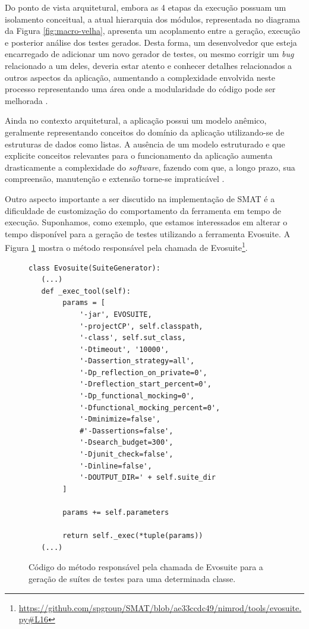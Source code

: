 \documentclass[12pt]{article}
\begin{document}
Do ponto de vista arquitetural, embora as 4 etapas da execução possuam um isolamento conceitual, a atual hierarquia dos módulos, representada no diagrama da Figura \ref{fig:macro-velha}, apresenta um acoplamento entre a geração, execução e posterior análise dos testes gerados. Desta forma, um desenvolvedor que esteja encarregado de adicionar um novo gerador de testes, ou mesmo corrigir um \textit{bug} relacionado a um deles, deveria estar atento e conhecer detalhes relacionados a outros aspectos da aplicação, aumentando a complexidade envolvida neste processo representando uma área onde a modularidade do código pode ser melhorada \cite{ousterhout2018philosophy}.

Ainda no contexto arquitetural, a aplicação possui um modelo anêmico, geralmente representando conceitos do domínio da aplicação utilizando-se de estruturas de dados como listas. A ausência de um modelo estruturado e que explicite conceitos relevantes para o funcionamento da aplicação aumenta drasticamente a complexidade do \textit{software}, fazendo com que, a longo prazo, sua compreensão, manutenção e extensão torne-se impraticável \cite{ddd}.

Outro aspecto importante a ser discutido na implementação de SMAT é a dificuldade de customização do comportamento da ferramenta em tempo de execução. Suponhamos, como exemplo, que estamos interessados em alterar o tempo disponível para a geração de testes utilizando a ferramenta Evosuite. A Figura \ref{fig:evosuite} mostra o método responsável pela chamada de Evosuite\footnote{\href{https://github.com/spgroup/SMAT/blob/ae33ccdc49/nimrod/tools/evosuite.py\#L16}{https://github.com/spgroup/SMAT/blob/ae33ccdc49/nimrod/tools/evosuite.py\#L16}}.

\begin{figure}[H]
    \begin{verbatim}
class Evosuite(SuiteGenerator):
   (...)
   def _exec_tool(self):
        params = [
            '-jar', EVOSUITE,
            '-projectCP', self.classpath,
            '-class', self.sut_class,
            '-Dtimeout', '10000',
            '-Dassertion_strategy=all',
            '-Dp_reflection_on_private=0',
            '-Dreflection_start_percent=0',
            '-Dp_functional_mocking=0',
            '-Dfunctional_mocking_percent=0',
            '-Dminimize=false',
            #'-Dassertions=false',
            '-Dsearch_budget=300',
            '-Djunit_check=false',
            '-Dinline=false',
            '-DOUTPUT_DIR=' + self.suite_dir
        ]
 
        params += self.parameters
 
        return self._exec(*tuple(params))
   (...)
    \end{verbatim}
    \caption{Código do método responsável pela chamada de Evosuite para a geração de suítes de testes para uma determinada classe.}
    \label{fig:evosuite}
\end{figure}
\end{document}
